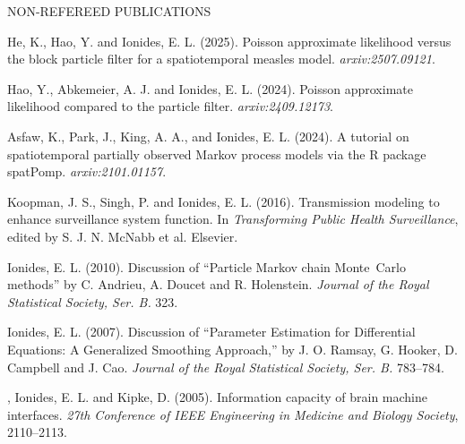 \begin{reflist} {NON-REFEREED PUBLICATIONS}

\item He, K., Hao, Y. and Ionides, E. L. (2025). Poisson approximate likelihood versus the block particle filter for a spatiotemporal measles model. {\it arxiv:2507.09121}.

\item Hao, Y., Abkemeier, A. J. and Ionides, E. L. (2024). Poisson approximate likelihood compared to the particle filter. {\it arxiv:2409.12173}.
  
\item Asfaw, K., Park, J., King, A. A., and Ionides, E. L. (2024). A tutorial on spatiotemporal partially observed Markov process models via the R package spatPomp. {\it arxiv:2101.01157}.
  
\item
Koopman, J. S., Singh, P. and Ionides, E. L. (2016). Transmission modeling to enhance surveillance system function. In {\em Transforming Public Health Surveillance}, edited by S. J. N. McNabb et al. Elsevier.

\item\formal{[[\ionidesJRSSBb] ]} 
Ionides, E. L. (2010). Discussion of ``Particle Markov chain Monte~Carlo methods'' by C. Andrieu, A. Doucet and R. Holenstein.
{\em Journal of the Royal Statistical Society, Ser. B.} {}{\separator}323.

\item\formal{[[\ionidesJRSSBa] ]}  
Ionides, E. L. (2007). Discussion of ``Parameter Estimation for Differential Equations: A Generalized Smoothing Approach,'' by J. O. Ramsay, G. Hooker, D. Campbell and J. Cao. 
{\em Journal of the Royal Statistical Society, Ser. B.} {}{\separator}783--784.

\item\formal{[[\gageEMBS] ]}  
, Ionides, E. L. and
  Kipke, D. (2005). Information capacity of brain machine
  interfaces. {\em 27th Conference of IEEE Engineering in
  Medicine and Biology Society}, 2110--2113.


\end{reflist}

\lsp

